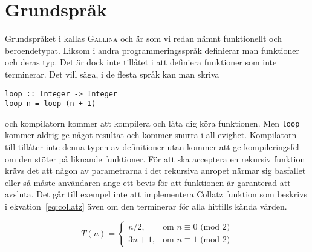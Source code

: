 \section{Grundspråk}
Grundspråket i \coq{} kallas \textsc{Gallina} och är som vi redan nämnt
funktionellt och beroendetypat. Liksom i andra programmeringsspråk definierar
man funktioner och deras typ. Det är dock inte tillåtet i \coq{} att definiera
funktioner som inte terminerar. Det vill säga, i de flesta språk kan man skriva
\begin{verbatim}
loop :: Integer -> Integer
loop n = loop (n + 1)
\end{verbatim}
och kompilatorn kommer att kompilera och låta dig köra funktionen. Men
\verb+loop+ kommer aldrig ge något resultat och kommer snurra i all evighet.
Kompilatorn till \coq{} tillåter inte denna typen av definitioner utan kommer att
ge kompileringsfel om den stöter på liknande funktioner. För att \coq{} ska
acceptera en rekursiv funktion krävs det att någon av parametrarna i det
rekursiva anropet närmar sig basfallet eller så måste användaren ange ett bevis
för att funktionen är garanterad att avsluta. Det går till exempel inte att
implementera Collatz funktion som beskrivs i ekvation~\ref{eq:collatz} även om
den terminerar för alla hittills kända värden.

\begin{equation}
\label{eq:collatz}
T(n) = \left\{\begin{matrix} n/2, & \mbox{om }n\equiv0\mbox{ (mod 2)} \\ 3n+1,
                         & \mbox{om }n\equiv1\mbox{ (mod 2)} \end{matrix}\right.
\end{equation}

